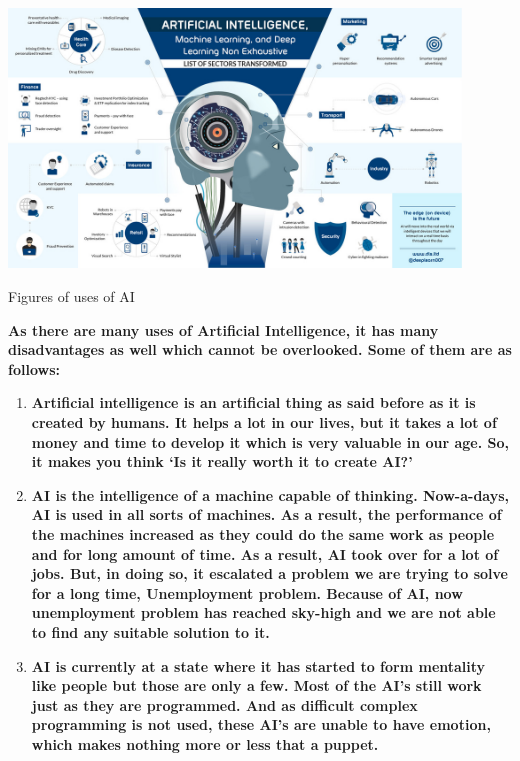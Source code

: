 \documentclass{article}
\begin{document}
\includegraphics[width=12cm]{uses of AI 2.jpg}\par
\centering
 \bf\large\caption{Figures of uses of AI}
 
\noindent

\newpage
\noindent \textbf{}

\noindent \textbf{As there are many uses of Artificial Intelligence, it has many disadvantages as well which cannot be overlooked. Some of them are as follows:}

\begin{enumerate}
\item  \textbf{Artificial intelligence is an artificial thing as said before as it is created by humans. It helps a lot in our lives, but it takes a lot of money and time to develop it which is very valuable in our age. So, it makes you think `Is it really worth it to create AI?'\underbar{}}

\item \textbf{AI is the intelligence of a machine capable of thinking. Now-a-days, AI is used in all sorts of machines. As a result, the performance of the machines increased as they could do the same work as people and for long amount of time. As a result, AI took over for a lot of jobs. But, in doing so, it escalated a problem we are trying to solve for a long time, Unemployment problem. Because of AI, now unemployment problem has reached sky-high and we are not able to find any suitable solution to it.\underbar{}}

\item \textbf{AI is currently at a state where it has started to form mentality like people but those are only a few. Most of the AI's still work just as they are programmed. And as difficult complex programming is not used, these AI's are unable to have emotion, which makes nothing more or less that a puppet.\underbar{}}
\end{enumerate}
\end{document}
